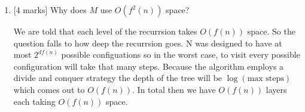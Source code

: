 \documentclass{article}
\begin{document}
\begin{enumerate}
\begin{enumerate}
                \item {[4 marks]} Why does $M$ use $O(f^2(n))$ space?
                
                We are told that each level of the recurrsion takes $O(f(n))$ space. So the question falls to how deep the recurrsion goes. N was designed to have at most $2^{df(n)}$ possible configuations so in the worst case, to visit every possible configuration will take that many steps. Because the algorithm employs a divide and conquer strategy the depth of the tree will be $\log (\text{max steps})$ which comes out to $O(f(n))$. In total then we have $O(f(n))$ layers each taking $O(f(n))$ space.
            \end{enumerate}
\end{enumerate}
\end{document}
